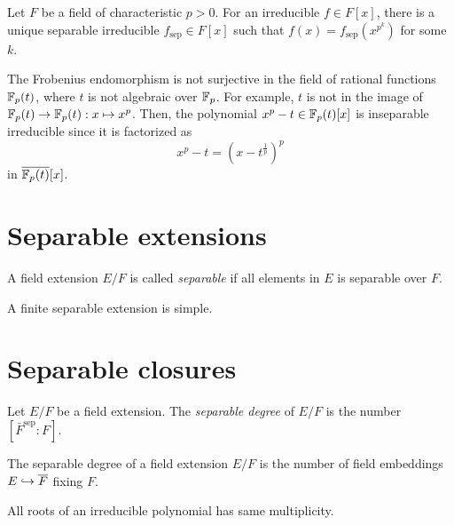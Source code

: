 \documentclass{../../large}
\newcommand{\sep}{\mathrm{sep}}
\begin{document}
\begin{prop}
Let $F$ be a field of characteristic $p>0$.
For an irreducible $f\in F[x]$, there is a unique separable irreducible $f_\sep\in F[x]$ such that $f(x)=f_\sep(x^{p^k})$ for some $k$.
\end{prop}

\begin{ex}
The Frobenius endomorphism is not surjective in the field of rational functions $\mathbb{F}_p(t)$, where $t$ is not algebraic over $\mathbb{F}_p$.
For example, $t$ is not in the image of $\mathbb{F}_p(t)\to\mathbb{F}_p(t):x\mapsto x^p$.
Then, the polynomial $x^p-t\in\mathbb{F}_p(t)[x]$ is inseparable irreducible since it is factorized as
\[x^p-t=(x-t^{\frac1p})^p\]
in $\overline{\mathbb{F}_p(t)}[x]$.
\end{ex}

\section{Separable extensions}
\begin{defn}
A field extension $E/F$ is called \emph{separable} if all elements in $E$ is separable over $F$.
\end{defn}

\begin{thm}
A finite separable extension is simple.
\end{thm}





\section{Separable closures}



\begin{defn}
Let $E/F$ be a field extension.
The \emph{separable degree} of $E/F$ is the number $[\bar F^{\sep}:F]$.
\end{defn}



\begin{thm}
The separable degree of a field extension $E/F$ is the number of field embeddings $E\hookrightarrow\overline F$ fixing $F$.
\end{thm}

\begin{lem}
All roots of an irreducible polynomial has same multiplicity.
\end{lem}
\begin{pf}
\end{pf}
\end{document}
